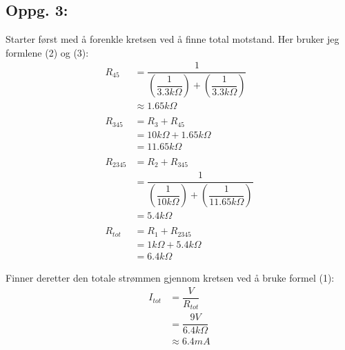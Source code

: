 \documentclass{article}
\begin{document}
            \subsection*{Oppg. 3:}
                Starter først med å forenkle kretsen ved å finne total motstand. Her bruker jeg formlene (2) og (3): 
                \begin{equation*}
                    \begin{split}
                        R_{45} &= \dfrac{1}{(\dfrac{1}{3.3k\Omega})+(\dfrac{1}{3.3k\Omega})} \\
                            &\approx 1.65k\Omega \\
                            \\
                        R_{345} &= R_3 + R_{45} \\
                                &= 10k\Omega + 1.65k\Omega \\
                                &= 11.65k\Omega \\
                                \\
                        R_{2345} &= R_2 + R_{345} \\
                                &= \dfrac{1}{(\dfrac{1}{10k\Omega})+(\dfrac{1}{11.65k\Omega})} \\
                                &= 5.4k\Omega \\
                                \\
                        R_{tot} &= R_1 + R_{2345} \\
                            &= 1k\Omega + 5.4k\Omega \\
                            &= 6.4k\Omega
                    \end{split}
                \end{equation*}

                Finner deretter den totale strømmen gjennom kretsen ved å bruke formel (1):
                    \begin{equation*}
                        \begin{split}
                            I_{tot} &= \dfrac{V}{R_{tot}} \\
                                &= \dfrac{9V}{6.4k\Omega} \\
                                &\approx 6.4mA
                        \end{split}
                    \end{equation*}
                
\end{document}
